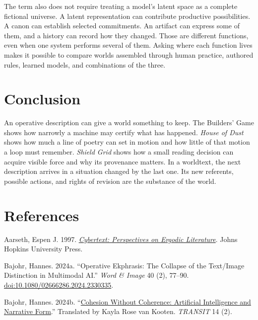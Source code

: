 \documentclass[
  11pt,
  letterpaper,
]{article}
\begin{document}
The term also does not require treating a model's latent space as a
complete fictional universe. A latent representation can contribute
productive possibilities. A canon can establish selected commitments. An
artifact can express some of them, and a history can record how they
changed. Those are different functions, even when one system performs
several of them. Asking where each function lives makes it possible to
compare worlds assembled through human practice, authored rules, learned
models, and combinations of the three.

\hypertarget{conclusion}{%
\section{Conclusion}\label{conclusion}}

An operative description can give a world something to keep. The
Builders' Game shows how narrowly a machine may certify what has
happened. \emph{House of Dust} shows how much a line of poetry can set
in motion and how little of that motion a loop must remember.
\emph{Shield Grid} shows how a small reading decision can acquire
visible force and why its provenance matters. In a worldtext, the next
description arrives in a situation changed by the last one. Its new
referents, possible actions, and rights of revision are the substance of
the world.

\clearpage

\hypertarget{references}{%
\section{References}\label{references}}

\small

Aarseth, Espen J. 1997.
\href{https://www.press.jhu.edu/books/title/1398/cybertext}{\emph{Cybertext:
Perspectives on Ergodic Literature}}. Johns Hopkins University Press.

Bajohr, Hannes. 2024a. ``Operative Ekphrasis: The Collapse of the
Text/Image Distinction in Multimodal AI.'' \emph{Word \& Image} 40 (2),
77--90.
\href{https://doi.org/10.1080/02666286.2024.2330335}{doi:10.1080/02666286.2024.2330335}.

Bajohr, Hannes. 2024b.
``\href{https://transit.berkeley.edu/2024/cohesion-without-coherence-artificial-intelligence-and-narrative-form/}{Cohesion
Without Coherence: Artificial Intelligence and Narrative Form}.''
Translated by Kayla Rose van Kooten. \emph{TRANSIT} 14 (2).
\end{document}
